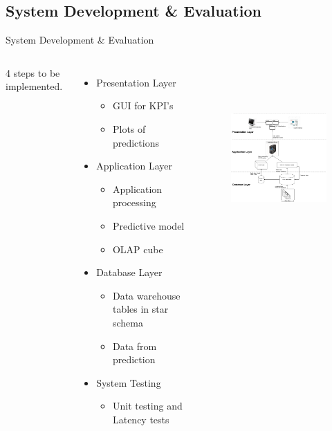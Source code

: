 \documentclass{beamer}
\begin{document}
\subsection{System Development \& Evaluation}
\begin{frame}{System Development \& Evaluation}
	\begin{columns}
			4 steps to be implemented.
	\begin{itemize}
		\item Presentation Layer
		\begin{itemize}
			\item GUI for KPI's
			\item Plots of predictions
		\end{itemize}
		\item Application Layer
		\begin{itemize}
			\item Application processing
			\item Predictive model
			\item OLAP cube
		\end{itemize}
		\item Database Layer
		\begin{itemize}
			\item Data warehouse tables in star schema
			\item Data from prediction
		\end{itemize}
		\item System Testing 
		\begin{itemize}
			\item Unit testing and Latency tests
		\end{itemize}
	\end{itemize}
	\begin{figure}
		\includegraphics[width=7cm,height=7cm]{ppt_figures/ICPCR_pic1SystemDesign}
		\centering
	\end{figure}
		\end{columns}
\end{frame}
\end{document}
